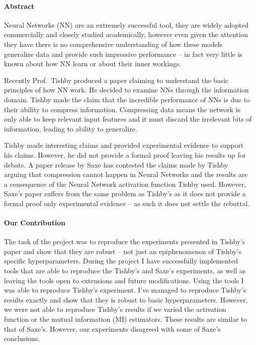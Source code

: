 \documentclass[dissertation.tex]{subfiles}
\begin{document}
\paragraph{Abstract}
Neural Networks (NN) are an extremely successful tool, they are widely adopted
commercially and closely studied academically, however even given the attention
they have there is no comprehensive understanding of how these models generalize
data and provide such impressive performance -- in fact very little is known
about how NN learn or about their inner workings. 

Recently Prof.\ Tishby
\cite{TISHBY} produced a paper claiming to understand the basic principles of
how NN work. He decided to examine NNs through the information domain. Tishby
made the claim that the incredible performance of NNs is due to their ability to
compress information. Compressing data means the network is only able to keep
relevant input features and it must discard the irrelevant bits of information,
leading to ability to generalize. 

Tishby made interesting claims and provided experimental evidence to support his
claims. However, he did not provide a formal proof leaving his results up for
debate. A paper release by Saxe \cite{SAXE} has contested the claims made by
Tishby arguing that compression cannot happen in Neural Networks and the results
are a consequence of the Neural Network activation function Tishby used.
However, Saxe's paper suffers from the same problem as Tishby's as it does not
provide a formal proof only experimental evidence -- as such it does not settle
the rebuttal.

\paragraph{Our Contribution}
The task of the project was to reproduce the experiments presented in Tishby's
paper and show that they are robust -- not just an epiphenomenon of Tishby's
specific hyperparameters. During the project I have successfully implemented
tools that are able to reproduce the Tishby's and Saxe's experiments, as well as
leaving the tools open to extensions and future modifications. Using the tools I
was able to reproduce Tishby's experiment. I've managed to reproduce Tishby's
results exactly and show that they is robust to basic hyperparameters. However,
we were not able to reproduce Tishby's results if we varied the activation
function or the mutual information (MI) estimators. These results are similar to
that of Saxe's. However, our experiments disagreed with some of Saxe's
conclusions.
\end{document}
